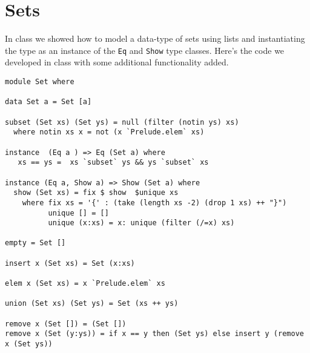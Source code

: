 \documentclass[11pt]{article}
\begin{document}

\section{Sets}

In class we showed how to model a data-type of sets using lists and instantiating the type as an instance of the {\tt{Eq}} and {\tt{Show}} type classes.  Here's the code we developed in class with some additional functionality added.

\begin{verbatim}
module Set where

data Set a = Set [a] 

subset (Set xs) (Set ys) = null (filter (notin ys) xs)
  where notin xs x = not (x `Prelude.elem` xs)

instance  (Eq a ) => Eq (Set a) where
   xs == ys =  xs `subset` ys && ys `subset` xs

instance (Eq a, Show a) => Show (Set a) where
  show (Set xs) = fix $ show  $unique xs
    where fix xs = '{' : (take (length xs -2) (drop 1 xs) ++ "}")
          unique [] = []
          unique (x:xs) = x: unique (filter (/=x) xs)

empty = Set []

insert x (Set xs) = Set (x:xs)

elem x (Set xs) = x `Prelude.elem` xs

union (Set xs) (Set ys) = Set (xs ++ ys)

remove x (Set []) = (Set [])
remove x (Set (y:ys)) = if x == y then (Set ys) else insert y (remove x (Set ys))
\end{verbatim}
\end{document}
